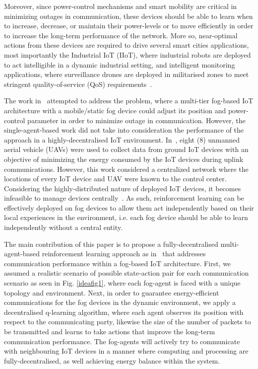 \documentclass[journal]{IEEEtran}
\begin{document}
Moreover, since power-control mechanisms and smart mobility are critical in minimizing outages in communication, these devices should be able to learn when to increase, decrease, or maintain their power-levels or to move efficiently in order to increase the long-term performance of the network. More so, near-optimal actions from these devices are required to drive several smart cities applications, most importantly the Industrial IoT (IIoT), where industrial robots are deployed to act intelligible in a dynamic industrial setting, and intelligent monitoring applications, where surveillance drones are deployed in militarised zones to meet stringent quality-of-service (QoS) requirements~\cite{OmoniwaRelay2018}.

The work in~\cite{OmoniwaRelay2018} attempted to address the problem, where a multi-tier fog-based IoT architecture with a mobile/static fog device could adjust its position and power-control parameter in order to minimize outage in communication. However, the single-agent-based work did not take into consideration the performance of the approach in a highly-decentralised IoT environment. In~\cite{Mozaffari2016}, eight (8) unmanned aerial vehicle (UAVs) were used to collect data from ground IoT devices with an objective of minimizing the energy consumed by the IoT devices during uplink communications. However, this work considered a centralized network where the locations of every IoT device and UAV were known to the control center. Considering the highly-distributed nature of deployed IoT devices, it becomes infeasible to manage devices centrally~\cite{Wilhelmi2017}. As such, reinforcement learning can be effectively deployed on fog devices to allow them act independently based on their local experiences in the environment, i.e. each fog device should be able to learn independently without a central entity.

The main contribution of this paper is to propose a fully-decentralised multi-agent-based reinforcement learning approach as in~\cite{Gueriau2018} that addresses communication performance within a fog-based IoT architecture. First, we assumed a realistic scenario of possible state-action pair for each communication scenario as seen in  Fig. \ref{ideafig1}, where each fog-agent is faced with a unique topology and environment. Next, in order to guarantee energy-efficient communications for the fog devices in the dynamic environment, we apply a decentralised q-learning algorithm, where each agent observes its position with respect to the communicating party, likewise the size of the number of packets to be transmitted and learns to take actions that improve the long-term communication performance. The fog-agents will actively try to communicate with neighbouring IoT devices in a manner where computing and processing are fully-decentralised, as well achieving energy balance within the system.
\end{document}
